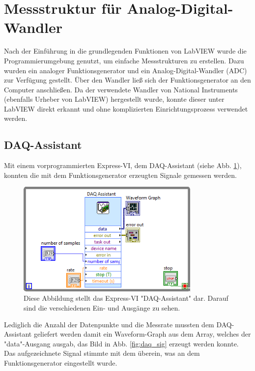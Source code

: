 \section{Messstruktur für Analog-Digital-Wandler}
	
Nach der Einführung in die grundlegenden Funktionen von LabVIEW wurde die Programmierumgebung genutzt, um einfache Messstrukturen zu erstellen.
Dazu wurden ein analoger Funktionsgenerator und ein Analog-Digital-Wandler (ADC) zur Verfügung gestellt.
Über den Wandler ließ sich der Funktionsgenerator an den Computer anschließen.
Da der verwendete Wandler von National Instruments (ebenfalls Urheber von LabVIEW) hergestellt wurde, konnte dieser unter LabVIEW direkt erkannt und ohne komplizierten Einrichtungsprozess verwendet werden.

\subsection{DAQ-Assistant}

Mit einem vorprogrammierten Express-VI, dem DAQ-Assistant (siehe Abb. \ref{fig:daq}), konnten die mit dem Funktionsgenerator erzeugten Signale gemessen werden.

\begin{figure}[ht]
	\centering
	\includegraphics[width=0.8\textwidth]{pic/daq.png}
	\caption{Diese Abbildung stellt das Express-VI "DAQ-Assistant" dar. Darauf sind die verschiedenen Ein- und Ausgänge zu sehen.}
	\label{fig:daq}	
\end{figure}

Lediglich die Anzahl der Datenpunkte und die Messrate mussten dem DAQ-Assistant geliefert werden damit ein Waveform-Graph aus dem Array, welches der "data"-Ausgang ausgab, das Bild in Abb. \ref{fig:daq_sig} erzeugt werden konnte. Das aufgezeichnete Signal stimmte mit dem überein, was an dem Funktionsgenerator eingestellt wurde.

